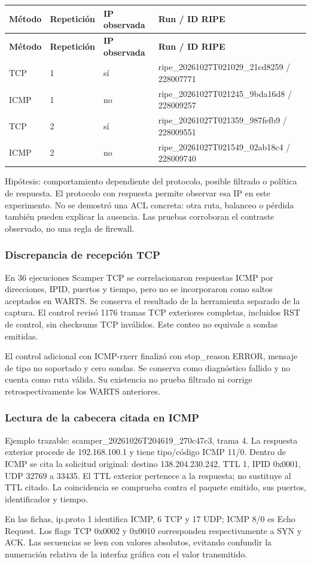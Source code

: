 \begingroup
\fontsize{9}{11}\selectfont
\addtocounter{table}{-1}
\begin{longtable}{p{1.5cm}p{1.8cm}p{2.2cm}p{8.7cm}}
\toprule
\textbf{Método} & \textbf{Repetición} & \textbf{IP observada} & \textbf{Run / ID RIPE} \\ \midrule
\endfirsthead
\toprule
\textbf{Método} & \textbf{Repetición} & \textbf{IP observada} & \textbf{Run / ID RIPE} \\ \midrule
\endhead
TCP & 1 & sí & ripe\_\allowbreak{}20261027T021029\_\allowbreak{}21cd8259 / 228007771 \\
ICMP & 1 & no & ripe\_\allowbreak{}20261027T021245\_\allowbreak{}9bda16d8 / 228009257 \\
TCP & 2 & sí & ripe\_\allowbreak{}20261027T021359\_\allowbreak{}987fefb9 / 228009551 \\
ICMP & 2 & no & ripe\_\allowbreak{}20261027T021549\_\allowbreak{}02ab18c4 / 228009740 \\
\bottomrule
\end{longtable}
\endgroup
Hipótesis: comportamiento dependiente del protocolo, posible filtrado o política de respuesta. El protocolo con respuesta permite observar esa IP en este experimento. No se demostró una ACL concreta: otra ruta, balanceo o pérdida también pueden explicar la ausencia. Las pruebas corroboran el contraste observado, no una regla de firewall.

\subsubsection{Discrepancia de recepción TCP}
En 36 ejecuciones Scamper TCP se correlacionaron respuestas ICMP por direcciones, IPID, puertos y tiempo, pero no se incorporaron como saltos aceptados en WARTS. Se conserva el resultado de la herramienta separado de la captura. El control revisó 1176 tramas TCP exteriores completas, incluidos RST de control, sin checksums TCP inválidos. Este conteo no equivale a sondas emitidas.

El control adicional con ICMP-rxerr finalizó con stop\_\allowbreak{}reason ERROR, mensaje de tipo no soportado y cero sondas. Se conserva como diagnóstico fallido y no cuenta como ruta válida. Su existencia no prueba filtrado ni corrige retrospectivamente los WARTS anteriores.

\subsubsection{Lectura de la cabecera citada en ICMP}
Ejemplo trazable: scamper\_\allowbreak{}20261026T204619\_\allowbreak{}270c47c3, trama 4. La respuesta exterior procede de 192.168.100.1 y tiene tipo/código ICMP 11/0. Dentro de ICMP se cita la solicitud original: destino 138.204.230.242, TTL 1, IPID 0x0001, UDP 32769 a 33435. El TTL exterior pertenece a la respuesta; no sustituye al TTL citado. La coincidencia se comprueba contra el paquete emitido, sus puertos, identificador y tiempo.

En las fichas, ip.proto 1 identifica ICMP, 6 TCP y 17 UDP; ICMP 8/0 es Echo Request. Los flags TCP 0x0002 y 0x0010 corresponden respectivamente a SYN y ACK. Las secuencias se leen con valores absolutos, evitando confundir la numeración relativa de la interfaz gráfica con el valor transmitido.


